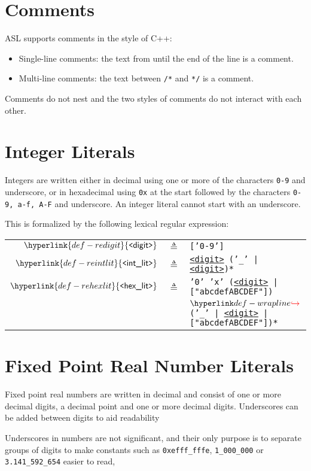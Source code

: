 \documentclass{book}
\newcommand\REdigit[0]{\hyperlink{def-redigit}{\texttt{<}\textsf{digit}\texttt{>}}}
\newcommand\REintlit[0]{\hyperlink{def-reintlit}{\texttt{<}\textsf{int\_lit}\texttt{>}}}
\newcommand\REhexlit[0]{\hyperlink{def-rehexlit}{\texttt{<}\textsf{hex\_lit}\texttt{>}}}
\begin{document}
\section{Comments}
ASL supports comments in the style of C++:
\begin{itemize}
\item Single-line comments: the text from \text{//} until the end of the line
is a comment.
\item Multi-line comments: the text between \texttt{/*} and \texttt{*/} is a comment.
\end{itemize}
Comments do not nest and the two styles of comments do not interact with each other.

\section{Integer Literals}
Integers are written either in decimal using one or more of the characters \texttt{0-9} and underscore, or in hexadecimal
using \texttt{0x} at the start followed by the characters \texttt{0-9, a-f, A-F} and underscore. An integer literal cannot start with
an underscore.

This is formalized by the following lexical regular expression:
\hypertarget{def-redigit}{}
\hypertarget{def-reintlit}{}
\hypertarget{def-rehexlit}{}
\begin{center}
\begin{tabular}{rcl}
$\REdigit$  &$\triangleq$& \texttt{['0-9']}\\
$\REintlit$ &$\triangleq$& \texttt{\REdigit\ ('\_' | \REdigit)*}\\
$\REhexlit$ &$\triangleq$& \texttt{'0' 'x' (\REdigit\ | ["abcdefABCDEF"])} \\
          &            & $\wrappedline$ \texttt{('\_' | \REdigit\ | ["abcdefABCDEF"])*}
\end{tabular}
\end{center}

\section{Fixed Point Real Number Literals}
Fixed point real numbers are written in decimal and consist of one or more decimal digits, a decimal point and one
or more decimal digits. Underscores can be added between digits to aid readability

Underscores in numbers are not significant, and their only purpose is to separate groups of digits to make constants
such as \texttt{0xefff\_fffe}, \texttt{1\_000\_000} or \texttt{3.141\_592\_654} easier to read,
\end{document}
